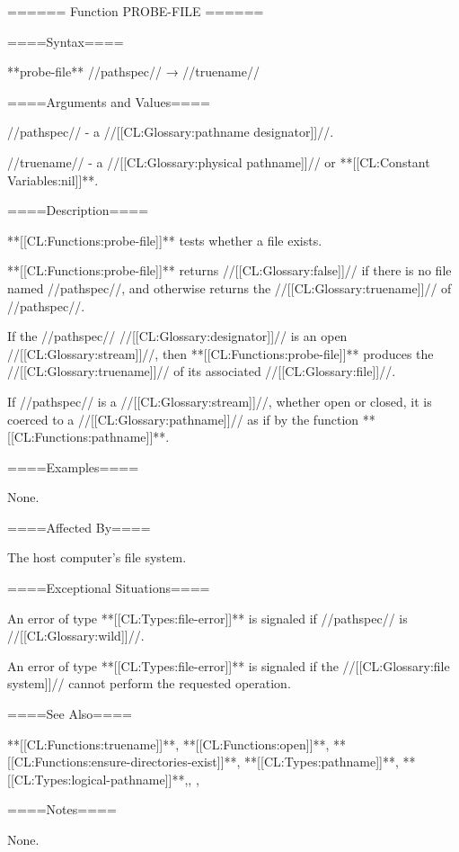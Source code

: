 ====== Function PROBE-FILE ======

====Syntax====

**probe-file** //pathspec// → //truename//

====Arguments and Values====

//pathspec// - a //[[CL:Glossary:pathname designator]]//.

//truename// - a //[[CL:Glossary:physical pathname]]// or **[[CL:Constant Variables:nil]]**.

====Description====

**[[CL:Functions:probe-file]]** tests whether a file exists.

**[[CL:Functions:probe-file]]** returns //[[CL:Glossary:false]]// if there is no file named //pathspec//, and otherwise returns the //[[CL:Glossary:truename]]// of //pathspec//.

If the //pathspec// //[[CL:Glossary:designator]]// is an open //[[CL:Glossary:stream]]//, then **[[CL:Functions:probe-file]]** produces the //[[CL:Glossary:truename]]// of its associated //[[CL:Glossary:file]]//.

If //pathspec// is a //[[CL:Glossary:stream]]//, whether open or closed, it is coerced to a //[[CL:Glossary:pathname]]// as if by the function **[[CL:Functions:pathname]]**.

====Examples====

None.

====Affected By====

The host computer's file system.

====Exceptional Situations====

An error of type **[[CL:Types:file-error]]** is signaled if //pathspec// is //[[CL:Glossary:wild]]//.

An error of type **[[CL:Types:file-error]]** is signaled if the //[[CL:Glossary:file system]]// cannot perform the requested operation.

====See Also====

**[[CL:Functions:truename]]**, **[[CL:Functions:open]]**, **[[CL:Functions:ensure-directories-exist]]**, **[[CL:Types:pathname]]**, **[[CL:Types:logical-pathname]]**,{\secref\FileSystemConcepts}, {\secref\OpenAndClosedStreams},

{\secref\PathnamesAsFilenames}

====Notes====

None.

       

